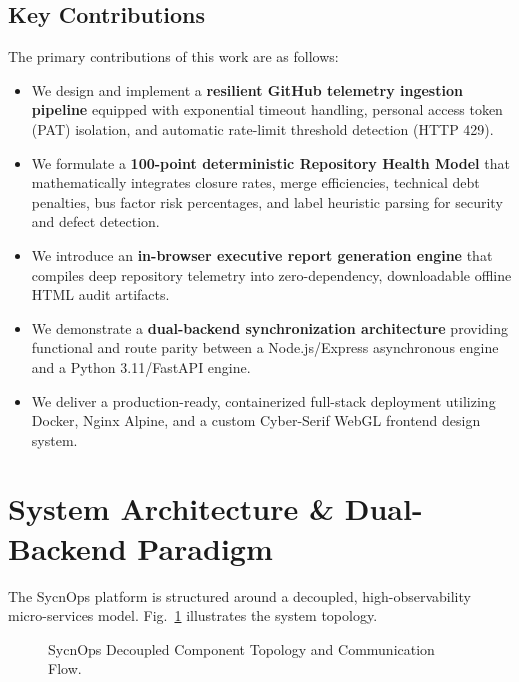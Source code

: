 \documentclass[conference]{IEEEtran}
\begin{document}
\subsection{Key Contributions}
The primary contributions of this work are as follows:
\begin{itemize}
    \item We design and implement a \textbf{resilient GitHub telemetry ingestion pipeline} equipped with exponential timeout handling, personal access token (PAT) isolation, and automatic rate-limit threshold detection (HTTP 429).
    \item We formulate a \textbf{100-point deterministic Repository Health Model} that mathematically integrates closure rates, merge efficiencies, technical debt penalties, bus factor risk percentages, and label heuristic parsing for security and defect detection.
    \item We introduce an \textbf{in-browser executive report generation engine} that compiles deep repository telemetry into zero-dependency, downloadable offline HTML audit artifacts.
    \item We demonstrate a \textbf{dual-backend synchronization architecture} providing functional and route parity between a Node.js/Express asynchronous engine and a Python 3.11/FastAPI engine.
    \item We deliver a production-ready, containerized full-stack deployment utilizing Docker, Nginx Alpine, and a custom Cyber-Serif WebGL frontend design system.
\end{itemize}

\section{System Architecture \& Dual-Backend Paradigm}
The SycnOps platform is structured around a decoupled, high-observability micro-services model. Fig.~\ref{fig:architecture} illustrates the system topology.

\begin{figure}[htbp]
\centering
{}
\caption{SycnOps Decoupled Component Topology and Communication Flow.}
\label{fig:architecture}
\end{figure}
\end{document}
